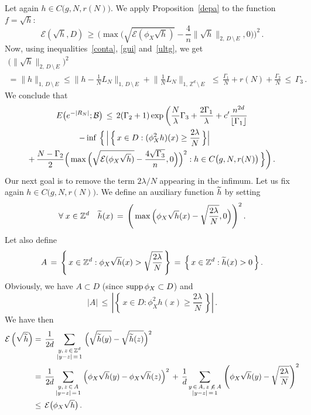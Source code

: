 \documentclass[AHL, Unicode, longabstracts, published]{cedram}
\newcommand{\tatop}[2]{\genfrac{}{}{0pt}{1}{#1}{#2}}
\newcommand*\supp{\text{supp\,}}
\newcommand*\Zd {{\mathbb Z^d}}
\newcommand*\wh{{\tilde h}}
\newcommand{\cE}{\mathcal{E}}
\let\oldtilde\tilde
\renewcommand*{\tilde}[1]{\mathchoice{\widetilde{#1}}{\widetilde{#1}}{\oldtilde{#1}}{\oldtilde{#1}}}\let\oldhat\hat
\renewcommand*{\hat}[1]{\mathchoice{\widehat{#1}}{\widehat{#1}}{\oldhat{#1}}{\oldhat{#1}}}\let\oldexists\exists
\renewcommand*{\exists}{\mathrel{\oldexists}}
\let\oldforall\forall
\renewcommand*{\forall}{\mathrel{\oldforall}}
\begin{document}
Let again $h\in C\big(g,N, r(N)\big)$. We apply Proposition~\ref{depa} to the function $f=\sqrt{h}$:
\[
\cE(\sqrt{h},D)\,\geq\,
\Bigg(\max
\Big(\sqrt{\cE(\phi_X\sqrt{h})}-
\frac{4}{n}
\|\sqrt{h}\|_{2,\,D\,\setminus\,E},0\Big)\Bigg)^2\,.
\]
Now, using inequalities~\eqref{conta}, \eqref{gui} and~\eqref{ultg}, we get
\begin{multline*}
\big(\|\sqrt{h}\|_{2,\,D\,\setminus\,E}\big)^2\\
= \|{h}\|_{1,\,D\,\setminus\,E} \leq
\Big\| h-\frac{1}{N}L_N
\Big\|_{1,\,D\,\setminus\,E} +
\Big\|
\frac{1}{N}L_N
\Big\|_{1,\,\Zd\,\setminus\,E}
\,
\,\leq\,\frac{\Gamma_1}{N}+r(N)+\frac{\Gamma_2}{N}
\,\leq\,\Gamma_3\,.
\end{multline*}
We conclude that
\begin{multline}\label{interm}
E\big(e^{-|R_N|}; {\mathcal B}
\big)\,\leq\, 2(\Gamma_2+1)
\exp\bigg(
\frac{N}{\lambda}\Gamma_3 +\frac{2\Gamma_1}{\lambda} + c'\frac{n^{2d}}{\lfloor\Gamma_1\rfloor}
\\
\mkern-33mu -\inf\,\Big\{\,
\Big|\,\Big\{\,x\in D: (\phi_X^2h)(x)\geq\frac{2\lambda}{N}
\,\Big\}\Big|\\
+\,\frac{N-\Gamma_2}{2}
\Big(\max\Big(\sqrt{\cE(\phi_X\sqrt{h})}-
\frac{4\sqrt{\Gamma_3}}{n},0\Big) \Big)^2 : h\in C\big(g,N,r(N) \big)
\,\Big\}\bigg)
\,.
\end{multline}
Our next goal is to remove the term $2\lambda/N$ appearing in the infimum. Let us fix again $h\in C\big(g,N,r(N) \big)$. We define an auxiliary function $\wh$ by setting
\[
\forall x \in\Zd\quad\wh(x)\,=\,\Bigg(\max\Big(\phi_X\sqrt{h}(x)-
\sqrt{\frac{2\lambda}{N}},0\Big)\Bigg)^2\,.
\]
Let also define
\[
A\,=\,\left\{\,x\in\Zd:
\phi_X\sqrt{h}(x)>
\sqrt{\frac{2\lambda}{N}}\,\right\}\,=\,
\Big\{\,x\in\Zd:
\wh(x)>0
\,\Big\}
\,.
\]
Obviously, we have $A\subset D$ (since $\supp \phi_X\subset D$) and
\[
\big|A\big|\,\leq\,
\left|\left\{\,x\in D:\phi_X^2h(x)\geq
{\frac{2\lambda}{N}} \,\right\}\right|\,.
\]
We have then
\begin{align*}
\cE\left(\sqrt{\wh}\right) & =\,
\frac{1}{2d}
\sum_{\tatop{y,\,z\,\in\,\Zd}{|y-z|\,=\,1}}
\Big(\sqrt{{\wh}(y)}-\sqrt{{\wh}(z)}\Big)^2\hfill\\
&=\,
\frac{1}{2d}\!
\sum_{\tatop{y,\,z\,\in\,A}{|y-z|\,=\,1}}
\Big(\phi_X\sqrt{h}(y)-\phi_X\sqrt{h}(z)\Big)^2
\,+\,
\frac{1}{d}\!
\sum_{\tatop{y\,\in\,A,\,z\,\not\,\in\,A}{|y-z|\,=\,1}}
\left(\phi_X\sqrt{h}(y)-
\sqrt{\frac{2\lambda}{N}}
\right)^2\\
&\leq\,
\cE\big(\phi_X\sqrt{h}\big)\,.
\end{align*}
\end{document}
